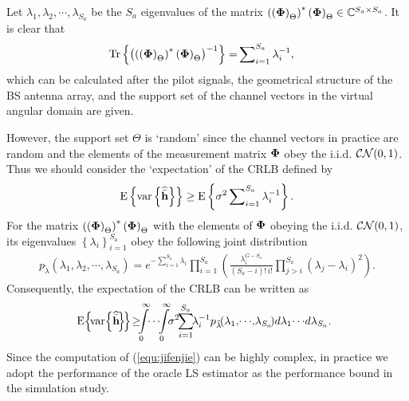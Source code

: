 \documentclass[final]{IEEEtran}
\begin{document}
 Let $\lambda_1,\lambda_2,\cdots ,\lambda_{S_a}$ be the $S_a$ eigenvalues of the matrix
 $\left(\left( {\bf{\Phi}} \right)_{\Theta}\right)^{*}\left({\bf{\Phi}}\right)_{\Theta}
 \in \mathbb{C}^{S_a\times S_a}$. It is clear that
\begin{align}\label{equ:qiyizhi} %
 {\rm Tr}\left\{ \left(\left(\left( {\bf{\Phi}} \right)_{\Theta}\right)^{*}
 \left( {\bf{\Phi}}\right)_{\Theta} \right)^{-1} \right\} =& \sum\nolimits_{i=1}^{S_a}
 \lambda_i^{-1} ,
\end{align}
 which can be calculated after the pilot signals, the geometrical structure of the BS
 antenna array, and the support set of the channel vectors in the virtual angular domain
 are given.

 However, the support set $\Theta$ is `random' since the channel vectors in practice are
 random and the elements of the measurement matrix ${\bf{\Phi }}$ obey the i.i.d.
 ${\cal{CN}}(0,1)$. Thus we should consider the `expectation' of the CRLB defined by
\begin{align}\label{eq28} %
 {\rm E}\left\{ {\rm var} \left\{ \widehat{\bar{\bf h}} \right\} \right\} \ge {\rm E}
 \left\{ \sigma^2\sum\nolimits_{i=1}^{S_a} \lambda_i^{-1} \right\} .
\end{align}
 For the matrix $\left(\left( {\bf{\Phi}} \right)_{\Theta}\right)^{*}\left( {\bf{\Phi}}
 \right)_{\Theta}$ with the elements of ${\bf{\Phi}}$ obeying the i.i.d. ${\cal{CN}}(0,1)$,
 its eigenvalues $\left\{ \lambda_i \right\}_{i=1}^{S_a}$ obey the following joint
 distribution \cite{qiyizhi}
\begin{align}\label{eq29}
\!\!\!\!  p_{\tilde \lambda}\!\left( \lambda_1,\!\lambda_2,\!\cdots \!,\!\lambda_{S_a} \! \right)
 \!= \! e^{-\!\!\sum\limits_{i=1}^{S_a} \! \lambda_i}\!\! \prod\limits_{i=1}^{S_a}\!\!\left(\!\!
 \frac{\lambda_i^{G-S_a}}{\left( S_a - i \right)! \, i !}\!\! \prod\limits_{j > i}^{S_a}
 \!\!\left( \lambda_j \!- \!\lambda_i \!\right)^2\!\!\right)\!.
\end{align}
 Consequently, the expectation of the CRLB can be written as
\begin{align}\label{equ:jifenjie} %
\!\!\! {\rm E}\! \left\{ \!{\rm var} \!\left\{ \widehat{\bar{\bf h}}\! \right\}\! \right\}\! \ge \!\!\!
 \int\limits_0^{\infty} \!\! \cdots \!\!\int\limits_0^{\infty}\!\! \sigma^2\!\!\sum\limits_{i=1}^{S_a}\!\! \lambda_i^{-1}
 p_{\tilde \lambda}\!\!\left( \lambda_1, \!\cdots \! ,\! \lambda_{S_a} \!\right)\! d{\lambda_1} \!\cdots \! d{\lambda_{S_a}}.
\end{align}
 Since the computation of (\ref{equ:jifenjie}) can be highly complex, in practice we adopt the
 performance of the oracle LS estimator as the performance bound in the simulation study.
\end{document}
